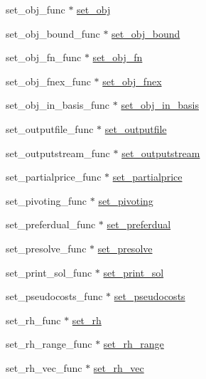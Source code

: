 \begin{DoxyCompactItemize}
set\+\_\+obj\+\_\+func $\ast$ \hyperlink{struct__lprec_a1363916bd0b87568fba001aa753657df}{set\+\_\+obj}
\item 
set\+\_\+obj\+\_\+bound\+\_\+func $\ast$ \hyperlink{struct__lprec_aab0312a747474dbca721e02afd7f0396}{set\+\_\+obj\+\_\+bound}
\item 
set\+\_\+obj\+\_\+fn\+\_\+func $\ast$ \hyperlink{struct__lprec_a9301b82f3fe6b6577f789bccbaf4ebc6}{set\+\_\+obj\+\_\+fn}
\item 
set\+\_\+obj\+\_\+fnex\+\_\+func $\ast$ \hyperlink{struct__lprec_a8d1ea6024f96ec19a054ead321666032}{set\+\_\+obj\+\_\+fnex}
\item 
set\+\_\+obj\+\_\+in\+\_\+basis\+\_\+func $\ast$ \hyperlink{struct__lprec_ae90e16ea4bd6c7c88769e6b854c9e1e2}{set\+\_\+obj\+\_\+in\+\_\+basis}
\item 
set\+\_\+outputfile\+\_\+func $\ast$ \hyperlink{struct__lprec_abd3060e0f2aa834bb00dfb32e7da93f8}{set\+\_\+outputfile}
\item 
set\+\_\+outputstream\+\_\+func $\ast$ \hyperlink{struct__lprec_a2a7632dfebb62f041e0bca85d4ffb26c}{set\+\_\+outputstream}
\item 
set\+\_\+partialprice\+\_\+func $\ast$ \hyperlink{struct__lprec_a6a92864cd7f981c2981d1a81cb54c9a4}{set\+\_\+partialprice}
\item 
set\+\_\+pivoting\+\_\+func $\ast$ \hyperlink{struct__lprec_a5b59d30e068314bb250700346481deae}{set\+\_\+pivoting}
\item 
set\+\_\+preferdual\+\_\+func $\ast$ \hyperlink{struct__lprec_ac1bf8e2ce70b3332c4eac837273e03ee}{set\+\_\+preferdual}
\item 
set\+\_\+presolve\+\_\+func $\ast$ \hyperlink{struct__lprec_a8bae240eeafcdf48ba003e04632ca607}{set\+\_\+presolve}
\item 
set\+\_\+print\+\_\+sol\+\_\+func $\ast$ \hyperlink{struct__lprec_a3b80b45e679cc9a8c170dcdbf50c6b3c}{set\+\_\+print\+\_\+sol}
\item 
set\+\_\+pseudocosts\+\_\+func $\ast$ \hyperlink{struct__lprec_ade267c78dc545b3431e39bd8805b5ea3}{set\+\_\+pseudocosts}
\item 
set\+\_\+rh\+\_\+func $\ast$ \hyperlink{struct__lprec_a770b95a0061e31fa7b558f21ddf2fa92}{set\+\_\+rh}
\item 
set\+\_\+rh\+\_\+range\+\_\+func $\ast$ \hyperlink{struct__lprec_a412aa504ef56e5a666e1c02d5951b0f5}{set\+\_\+rh\+\_\+range}
\item 
set\+\_\+rh\+\_\+vec\+\_\+func $\ast$ \hyperlink{struct__lprec_aa958833e471c17f69cb146d874b80343}{set\+\_\+rh\+\_\+vec}

\end{DoxyCompactItemize}
